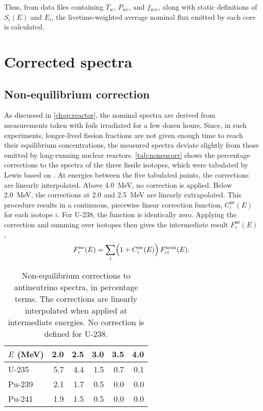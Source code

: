 \documentclass[../thesis.tex]{subfiles}
\begin{document}
Thus, from data files containing $T_w$, $P_{wc}$, and $f_{wci}$, along with static definitions of $S_i(E)$ and $E_i$, the livetime-weighted average nominal flux emitted by each core is calculated.

\section{Corrected spectra}
\label{sec:corrspectra}

\subsection{Non-equilibrium correction}
\label{sec:noneqcorrspectra}

As discussed in \autoref{chap:reactor}, the nominal spectra are derived from measurements taken with foils irradiated for a few dozen hours. Since, in such experiments, longer-lived fission fractions are not given enough time to reach their equilibrium concentrations, the measured spectra deviate slightly from those emitted by long-running nuclear reactors. \autoref{tab:noneqcorr} shows the percentage corrections to the spectra of the three fissile isotopes, which were tabulated by Lewis \cite{Lewis} based on \cite{Mueller_2011}. At energies between the five tabulated points, the corrections are linearly interpolated. Above 4.0~MeV, no correction is applied. Below 2.0~MeV, the corrections at 2.0 and 2.5~MeV are linearly extrapolated. This procedure results in a continuous, piecewise linear correction function, $C^\mathrm{ne}_i(E)$ for each isotope $i$. For U-238, the function is identically zero. Applying the correction and summing over isotopes then gives the intermediate result $F^\mathrm{ne}_c(E)$,
\[ F^\mathrm{ne}_c(E) = \sum_i \Bigl(1 + C^\mathrm{ne}_i(E)\Bigr)\,
  F^\mathrm{nom}_{ci}(E). \]

\begin{table}
  \centering
  \begin{tabular}{lrrrrr}
    \toprule
    $E$ (MeV) & 2.0 & 2.5 & 3.0 & 3.5 & 4.0 \\
    \midrule
    U-235 & 5.7 & 4.4 & 1.5 & 0.7 & 0.1 \\
    Pu-239 & 2.1 & 1.7 & 0.5 & 0.0 & 0.0 \\
    Pu-241 & 1.9 & 1.5 & 0.5 & 0.0 & 0.0 \\
    \bottomrule
  \end{tabular}
  \caption{Non-equilibrium corrections to antineutrino spectra, in percentage terms. The corrections are linearly interpolated when applied at intermediate energies. No correction is defined for U-238.}
  \label{tab:noneqcorr}
\end{table}
\end{document}
